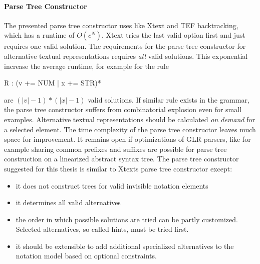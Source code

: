 \paragraph{Parse Tree Constructor}
The presented parse tree constructor uses like Xtext and TEF backtracking, which has a runtime of $O(c^N)$. Xtext tries the last valid option first and just requires one valid solution. The requirements for the parse tree constructor for alternative textual representations requires \emph{all} valid solutions. This exponential increase the average runtime, for example for the rule
\begin{xtxt}
R : (v += NUM | x += STR)*
\end{xtxt}
are $( |v| - 1 ) * ( |x| - 1)$ valid solutions. If similar rule exists in the grammar, the parse tree constructor suffers from combinatorial explosion even for small examples.  Alternative textual representations should be calculated \emph{on demand} for a selected element. The time complexity of the parse tree constructor leaves much space for improvement. It remains open if optimizations of GLR parsers, like for example sharing common prefixes and suffixes are possible for parse tree construction on a linearized abstract syntax tree. The parse tree constructor suggested for this thesis is similar to Xtexts parse tree constructor except:
\begin{itemize}
	\item it does not construct trees for valid invisible notation elements
	\item it determines all valid alternatives
	\item the order in which possible solutions are tried can be partly customized. Selected alternatives, so called hints, must be tried first.
	\item it should be extensible to add additional specialized alternatives to the notation model based on optional constraints.
\end{itemize}

